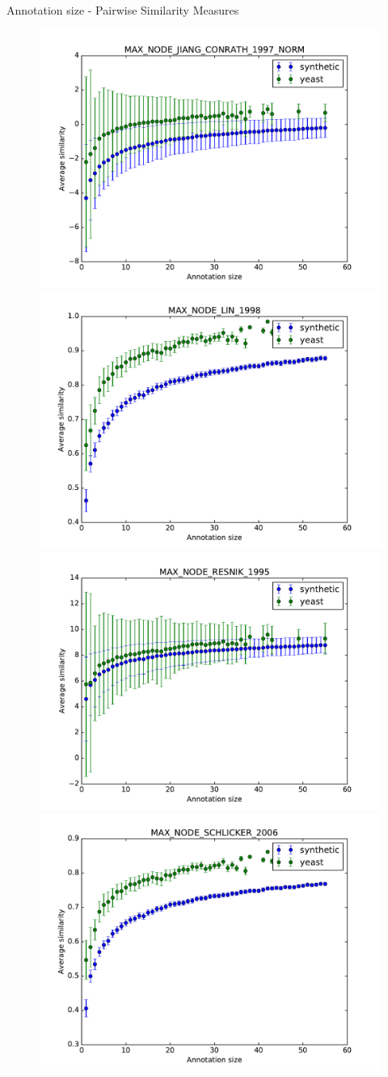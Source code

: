 \documentclass{beamer}
\begin{document}

\begin{frame}{Annotation size - Pairwise Similarity Measures}
\begin{figure}
\includegraphics[width=0.5\linewidth, height=0.4\textheight]{pairwise/SIM_GROUPWISE_MAX_SIM_PAIRWISE_DAG_NODE_JIANG_CONRATH_1997_NORM_avg.pdf}
\includegraphics[width=0.5\linewidth, height=0.4\textheight]{pairwise/SIM_GROUPWISE_MAX_SIM_PAIRWISE_DAG_NODE_LIN_1998_avg.pdf} \\
\includegraphics[width=0.5\linewidth, height=0.4\textheight]{pairwise/SIM_GROUPWISE_MAX_SIM_PAIRWISE_DAG_NODE_RESNIK_1995_avg.pdf}
\includegraphics[width=0.5\linewidth, height=0.4\textheight]{pairwise/SIM_GROUPWISE_MAX_SIM_PAIRWISE_DAG_NODE_SCHLICKER_2006_avg.pdf}
\end{figure}
\end{frame}
\end{document}
